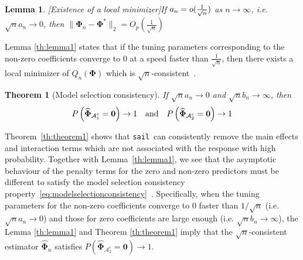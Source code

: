 \documentclass[a4paper,fleqn]{cas-sc}
\newtheorem{theorem}{Theorem}
\newtheorem{lemma}{Lemma}
\newcommand{\sail}{\texttt{sail}}
\newcommand{\A}{\mathcal{A}}
\begin{document}

{\normalsize{}\begin{lemma}{[}Existence of a local minimizer{]}\label{th:lemma1}
		If $a_{n}=o(\text{\ensuremath{\frac{1}{\sqrt{n}}}})$ as $n\rightarrow\infty$,
		i.e. $\sqrt{n}a_{n}\to0$, then $\|\widehat{\boldsymbol{\Phi}}_{n}-\boldsymbol{\Phi}^{*}\|_{2}=O_{p}(\frac{1}{\sqrt{n}})$
\end{lemma}}{\normalsize\par}

{\normalsize{}Lemma \eqref{th:lemma1}
	states that if the tuning parameters corresponding to the non-zero
	coefficients converge to 0 at a speed faster than $\frac{1}{\sqrt{n}}$,
	then there exists a local minimizer of $Q_{n}(\boldsymbol{\Phi})$
	which is $\sqrt{n}$-consistent~\citep{wang2007regression,choi2010variable}.
}{\normalsize\par}



{\normalsize{}\begin{theorem}[Model selection consistency] \label{th:theorem1}
		If $\sqrt{n}a_{n}\to0$ and $\sqrt{n}b_{n}\to\infty$, then 
		\begin{equation}
		P\left(\widehat{\boldsymbol{\Phi}}_{\mathcal{\A}_{1}^{c}}=\mathbf{0}\right)\rightarrow1\quad\text{and\ensuremath{\quad}}P\left(\widehat{\boldsymbol{\Phi}}_{\mathcal{\A}_{2}^{c}}=\mathbf{0}\right)\rightarrow1\label{eq:modelselectionconsistency}
		\end{equation}
\end{theorem}}{\normalsize\par}

{\normalsize{}Theorem~\eqref{th:theorem1}
	shows that \sail ~can consistently remove the main effects and interaction
	terms which are not associated with the response with high probability.
	Together with Lemma~\eqref{th:lemma1}, we see that the asymptotic
	behaviour of the penalty terms for the zero and non-zero predictors
	must be different to satisfy the model selection consistency property~\eqref{eq:modelselectionconsistency}~\citep{nardi2008asymptotic}.
	Specifically, when the tuning parameters for the non-zero coefficients
	converge to 0 faster than $1/\sqrt{n}$ (i.e. $\sqrt{n}a_{n}\rightarrow0$)
	and those for zero coefficients are large enough (i.e. $\sqrt{n}b_{n}\rightarrow\infty$),
	the Lemma \eqref{th:lemma1} and Theorem \eqref{th:theorem1} imply
	that the $\sqrt{n}$-consistent estimator $\widehat{\boldsymbol{\Phi}}_{n}$
	satisfies $P\left(\widehat{\boldsymbol{\Phi}}_{\mathcal{\A}_{2}^{c}}=\mathbf{0}\right)\rightarrow1$. }{\normalsize\par}
\end{document}

